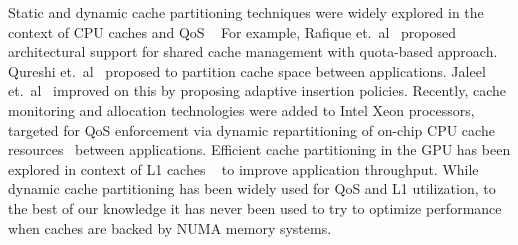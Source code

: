 Static and dynamic cache partitioning techniques were widely explored in the
context of CPU caches and QoS
~\cite{ics2007,Herdrich2016CacheQF,pact06,qureshi-micro,jaleel-pact} For
example, Rafique et.~al~\cite{pact06} proposed architectural support for shared
cache management with quota-based approach. Qureshi et.~al~\cite{qureshi-micro}
proposed to partition cache space between applications. Jaleel et.~al~\cite{jaleel-pact} 
improved on this by proposing adaptive insertion
policies. Recently, cache monitoring and allocation technologies were added to
Intel Xeon processors, targeted for QoS enforcement via dynamic repartitioning
of on-chip CPU cache resources~\cite{Herdrich2016CacheQF} between applications.  
Efficient cache partitioning in the GPU has been explored in context of L1 caches
~\cite{li-priority-based} to improve application throughput. While dynamic cache 
partitioning has been widely used for
QoS and L1 utilization, to the best of our knowledge it has never been used
to try to optimize performance when caches are backed by NUMA memory
systems.
